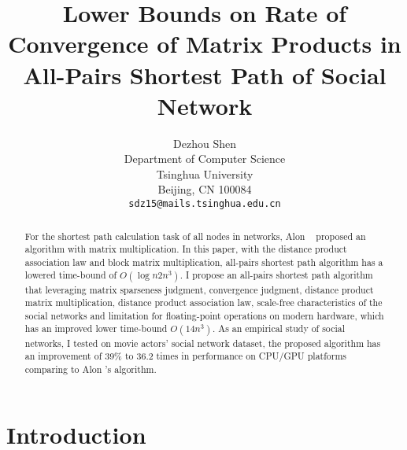 \documentclass[review]{cvpr}
\begin{document}
\title{Lower Bounds on Rate of Convergence of Matrix Products in All-Pairs Shortest Path of Social Network}

\author{Dezhou Shen\\
Department of Computer Science\\
Tsinghua University\\
Beijing, CN 100084\\
{\tt\small sdz15@mails.tsinghua.edu.cn}
}

\maketitle


\begin{abstract}
  For the shortest path calculation task of all nodes in networks, Alon \etal~\cite{alon1997exponent} proposed an algorithm with matrix multiplication.
  In this paper, with the distance product association law and block matrix multiplication, all-pairs shortest path algorithm has a lowered time-bound of \(O(\log{n}2n^3)\).
  I propose an all-pairs shortest path algorithm that leveraging matrix sparseness judgment, convergence judgment, distance product matrix multiplication, distance product association law,
  scale-free characteristics of the social networks and limitation for floating-point operations on modern hardware, which has an improved lower time-bound \(O(14n^3)\).
  As an empirical study of social networks, I tested on movie actors' social network dataset, the proposed algorithm has an improvement of 39\% to 36.2 times in performance on CPU/GPU platforms comparing to Alon \etal's algorithm.
\end{abstract}

\section{Introduction}
\end{document}
